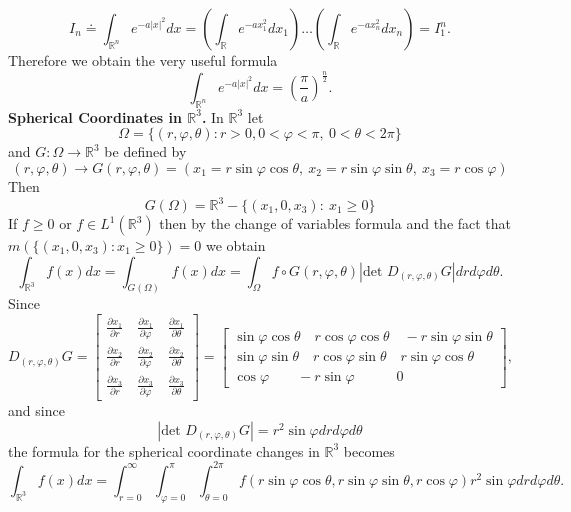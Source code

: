 \documentclass[12pt]{report}
\begin{document}
\[
I_n \doteq \int_{\mathbb{R}^n} e^{-a|x|^2} dx = \left
( \int_{\mathbb{R}} e^{-ax^2_1} dx_1\right ) \dots
\left ( \int_{\mathbb{R}} e^{-ax^2_n} dx_n\right ) =
I^n_1.
\]
Therefore we obtain the very useful formula
\[
 \int_{\mathbb{R}^n} e^{-a|x|^2} dx = \left (
\frac{\pi}{a} \right )^{\frac{n}{2}}.
\]
{\large \bf Spherical Coordinates in $\mathbb{R}^3$.}  In
$\mathbb{R}^3$ let
\[
\Omega = \{(r, \varphi, \theta): r > 0, 0 < \varphi < \pi,
\ 0 < \theta < 2 \pi\}
\]
and $G: \Omega \longrightarrow \mathbb{R}^3$ be
defined by
\[
(r, \varphi, \theta) \longrightarrow G(r, \varphi,
\theta) = (x_1 = r\sin \varphi \cos \theta, \ x_2 =
r\sin \varphi \sin \theta, \ x_3 = r \cos \varphi)
\]
Then
\[
G(\Omega) = \mathbb{R}^3 - \{(x_1, 0, x_3): \ x_1 \ge
0\}
\]
If $f \ge 0 $ or $f \in L^1 (\mathbb{R}^3)$ then by the
change of variables formula and the fact that
$m(\{(x_1, 0, x_3): x_1 \ge 0\}) = 0$ we obtain
\[
\int_{\mathbb{R}^3} f(x) dx = \int_{G(\Omega)} f(x)
dx = \int_\Omega f \circ G(r, \varphi, \theta)
|\mbox{det } D_{(r, \varphi, \theta)} G| dr d\varphi d
\theta.
\]
Since
\[
D_{(r, \varphi, \theta)} G = \left [ \begin{array}{ll}
\displaystyle{\frac{\partial x_1}{\partial r}  \quad \frac{\partial
x_1}{\partial \varphi} \quad \frac{\partial
x_1}{\partial \theta} }\\
\displaystyle{\frac{\partial x_2}{\partial r} \quad \frac{\partial
x_2}{\partial \varphi} \quad \frac{\partial
x_2}{\partial \theta} }\\
\displaystyle{\frac{\partial x_3}{\partial r} \quad \frac{\partial
x_3}{\partial \varphi} \quad \frac{\partial
x_3}{\partial \theta} }\end{array}  \right ] = \left [
\begin{array}{ll}
\sin \varphi \cos \theta \quad r \cos \varphi \cos
\theta \quad -r \sin \varphi \sin \theta\\
\sin \varphi \sin \theta \quad r \cos \varphi \sin
\theta \quad r \sin \varphi \cos \theta\\
\cos \varphi \qquad -r \sin \varphi \quad\quad\quad 0
\end{array}\right ],
\]
and since
\[|\mbox{det } D_{(r, \varphi, \theta)} G| = r^2 \sin
\varphi dr d \varphi d \theta
\]
the formula for the spherical coordinate changes in
$\mathbb{R}^3$ becomes
\[
\int_{\mathbb{R}^3} f(x) dx = \int^\infty_{r=0}
\int^\pi_{\varphi = 0} \int^{2 \pi}_{\theta = 0} f(r \sin
\varphi \cos \theta, r \sin \varphi \sin \theta, r \cos
\varphi) r^2 \sin \varphi dr d\varphi d \theta .
\]
\end{document}
